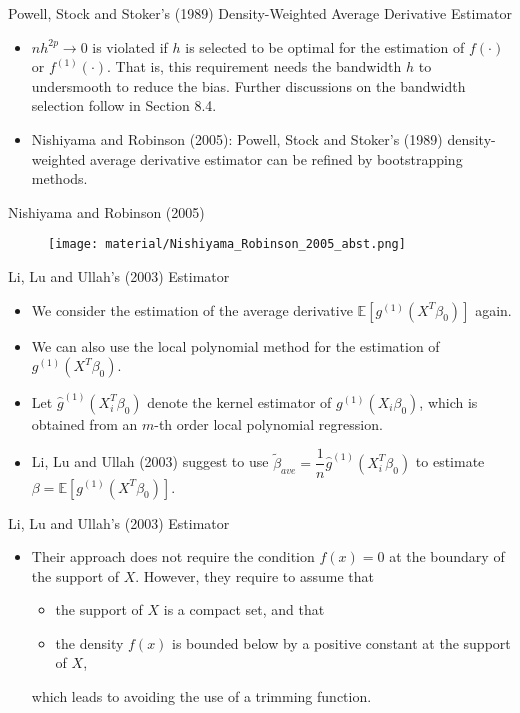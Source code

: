 \documentclass[xcolor=svgnames,dvipdfmx,cjk]{beamer}
\theoremstyle{example}
\def\E{\mathbb{E}}
\begin{document}
\begin{frame}{Powell, Stock and Stoker's (1989) Density-Weighted Average Derivative Estimator}
\begin{itemize}
  \item $nh^{2p} \to 0$ is violated if $h$ is selected to be optimal for the estimation of $f(\cdot)$ or $f^{(1)}(\cdot)$.
        That is, this requirement needs \alert{the bandwidth $h$ to undersmooth to reduce the bias}.
        Further discussions on the bandwidth selection follow in Section 8.4.
  \item Nishiyama and Robinson (2005): Powell, Stock and Stoker's (1989) density-weighted average derivative estimator can be refined by bootstrapping methods.
\end{itemize}  
\end{frame}

\begin{frame}{Nishiyama and Robinson (2005)}
  \begin{figure}
    \begin{center}
    \texttt{[image: material/Nishiyama\_Robinson\_2005\_abst.png]}
    \end{center}
  \end{figure}
\end{frame}

\begin{frame}{Li, Lu and Ullah's (2003) Estimator}
\begin{itemize}
  \item We consider the estimation of the average derivative $\E[g^{(1)}(X^T\beta_0)]$ again.
  \item We can also use the local polynomial method for the estimation of $g^{(1)}(X^T\beta_0)$.
  \item Let $\hat{g}^{(1)}(X_i^T\beta_0)$ denote the kernel estimator of $g^{(1)}(X_i\beta_0)$,
        which is obtained from an $m$-th order local polynomial regression.
  \item Li, Lu and Ullah (2003) suggest to use $\tilde{\beta}_{ave} = \dfrac{1}{n}\hat{g}^{(1)}(X_i^T\beta_0)$ 
        to estimate $\beta = \E[{g}^{(1)}(X^T\beta_0)]$.
\end{itemize}
\end{frame}

\begin{frame}{Li, Lu and Ullah's (2003) Estimator}
\begin{itemize}
  \item Their approach does not require the condition $f(x)=0$ at the boundary of the support of $X$. 
        However, they require to assume that 
        \begin{itemize}
          \item the support of $X$ is a compact set, and that 
          \item the density $f(x)$ is bounded below by a positive constant at the support of $X$,
        \end{itemize}
        which leads to avoiding the use of a trimming function. 
\end{itemize}  
\end{frame}
\end{document}
